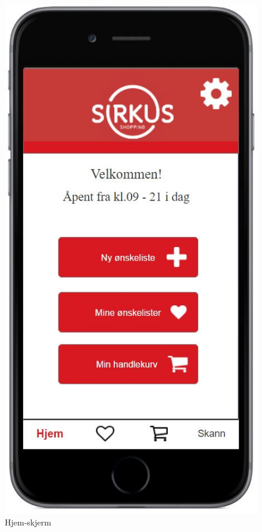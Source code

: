 \begin{figure}[H]
\includegraphics[scale=0.466]{images/axurebilder/hjem.JPG}
\centering %
\caption{Hjem-skjerm}
\label{fig:hjem-skjerm}
\end{figure}

